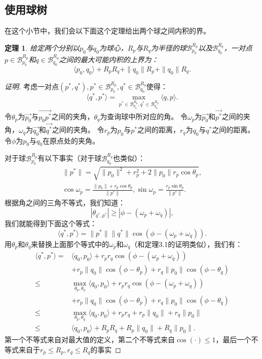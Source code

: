 \documentclass[twocolumn,a4paper]{article}
\begin{document}
\subsection{使用球树}
在这个小节中，我们会以下面这个定理给出两个球之间内积的界。
\newtheorem{theorem2}{定理}[section]
\begin{theorem2}
给定两个分别以$p_0$与$q_0$为球心，$R_p$与$R_q$为半径的球$\mathcal{B}_{p_0}^{R_p}$以及$\mathcal{B}_{q_0}^{R_q}$，一对点$p\in\mathcal{B}_{p_0}^{R_p}$和$q\in\mathcal{B}_{q_0}^{R_q}$之间的最大可能内积的上界为：
\begin{equation}
\langle p_0,q_0 \rangle + R_p R_q + \|q_0\|R_p + \|q_0\|R_q.
\end{equation}
\end{theorem2}
\begin{proof}[证明]
考虑一对点$(p^*,q^*),p^*\in\mathcal{B}_{p_0}^{R_p},q^*\in\mathcal{B}_{q_0}^{R_q}$使得：
\begin{equation}
\langle q^*,p^* \rangle = \max_{p^*\in\mathcal{B}_{p_0}^{R_p},q^*\in\mathcal{B}_{q_0}^{R_q}} \langle q,p \rangle.
\end{equation}
令$\theta_p$为$\vec{p_0}$与$\vec{p_0 p^*}$之间的夹角，$\theta_q$为查询球中所对应的角。
令$\omega_p$为$\vec{p_0}$和$\vec{p^*}$之间的夹角，$\omega_q$为$\vec{q_0}$和$\vec{q^*}$之间的夹角。
令$r_p$为$p_0$与$p^*$之间的距离，$r_q$为$q_0$与$q^*$之间的距离。
令$\phi$为$p_0$与$q_0$在原点处的夹角。

对于球$\mathcal{B}_{p_0}^{R_p}$有以下事实（对于球$\mathcal{B}_{q_0}^{R_q}$也类似）：
\begin{gather*}
\|p^*\| = \sqrt{\|p_0\|^2+r_p^2+2\|p_0\|r_p\cos\theta_p}, \\
\cos\omega_p = \frac{\|p_0\|+r_p\cos\theta_p}{\|p^*\|},\sin\omega_p = \frac{r_p\sin\theta_p}{\|p^*\|}.
\end{gather*}
根据角之间的三角不等式，我们知道：
\begin{equation*}
|\theta_{q^*,p^*}| \ge |\phi - (\omega_p + \omega_q)|,
\end{equation*}
我们就能得到下面这个等式：
\begin{equation}
\langle q^*,p^* \rangle = \|p^*\|\|q^*\|\cos(\phi-(\omega_p+\omega_q)).
\end{equation}
用$\theta_p$和$\theta_q$来替换上面那个等式中的$\omega_p$和$\omega_q$（和定理3.1的证明类似），我们有：
\begin{align*}
\langle q^*,p^* \rangle =
    & \langle q_0,p_0 \rangle + r_p r_q\cos(\phi-(\omega_p+\omega_q)) \\
    & + r_p\|q_0\|\cos(\phi-\theta_p)+r_q\|p_0\|\cos(\phi-\theta_q) \\
\le & \max_{\theta_p,\theta_q}\langle q_0,p_0 \rangle + r_p r_q\cos(\phi-(\omega_p+\omega_q)) \\
    & + r_p\|q_0\|\cos(\phi-\theta_p)+r_q\|p_0\|\cos(\phi-\theta_q) \\
\le & \max_{\theta_p,\theta_q}\langle q_0,p_0 \rangle + r_p r_q + r_p\|q_0\| + r_q\|p_0\| \\
\le & \langle q_0,p_0 \rangle + R_p R_q + R_p\|q_0\| + R_q\|p_0\|.
\end{align*}
第一个不等式来自对最大值的定义，第二个不等式来自$\cos(\cdot)\le1$，最后一个不等式来自于$r_p \le R_p, r_q \le R_q$的事实
\end{proof}
\end{document}
